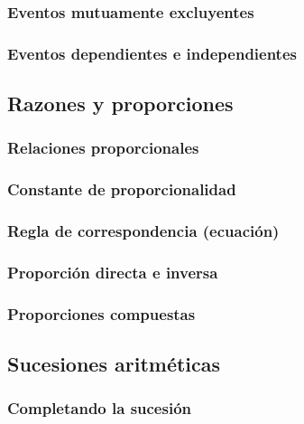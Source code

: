 \documentclass[12pt,repaso,answers]{RDS_unit}
\begin{document}
\begin{questions}
	\subsubsection{Eventos mutuamente excluyentes}
	\question[1]{}
	\subsubsection{Eventos dependientes e independientes}
	\question[1]{}
	\subsection   {Razones y proporciones}
	\subsubsection{Relaciones proporcionales}
	\question[1]{}
	\subsubsection{Constante de proporcionalidad}
	\question[1]{}
	\subsubsection{Regla de correspondencia (ecuación)}
	\question[1]{}
	\subsubsection{Proporción directa e inversa}
	\question[1]{}
	\subsubsection{Proporciones compuestas}
	\question[1]{}
	\subsection   {Sucesiones aritméticas}
	\subsubsection{Completando la sucesión}
	\question[1]{}

\end{questions}
\end{document}
